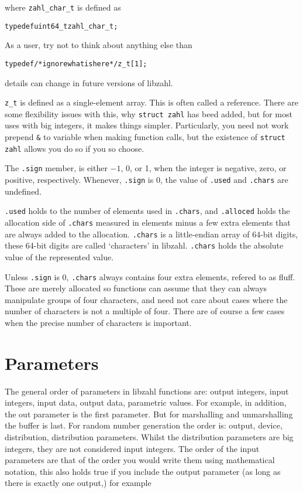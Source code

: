 \noindent
where {\tt zahl\_char\_t} is defined as

\begin{alltt}
   typedef uint64_t zahl_char_t;
\end{alltt}

\noindent
As a user, try not to think about anything else than

\begin{alltt}
   typedef \textcolor{c}{/* \textrm{ignore what is here} */} z_t[1];
\end{alltt}

\noindent
details can change in future versions of libzahl.

{\tt z\_t} is defined as a single-element array.
This is often called a reference. There are some
flexibility issues with this, why {\tt struct zahl}
has beed added, but for most uses with big integers,
it makes things simpler. Particularly, you need not
work prepend {\tt \&} to variable when making function
calls, but the existence of {\tt struct zahl} allows
you do so if you so choose.

The {\tt .sign} member, is either $-1$, 0, or 1,
when the integer is negative, zero, or positive,
respectively. Whenever, {\tt .sign} is 0, the value
of {\tt .used} and {\tt .chars} are undefined.

{\tt .used} holds to the number of elements used in
{\tt .chars}, and {\tt .alloced} holds the allocation
side of {\tt .chars} measured in elements minus a few
extra elements that are always added to the allocation.
{\tt .chars} is a little-endian array of 64-bit digits,
these 64-bit digits are called `characters' in libzahl.
{\tt .chars} holds the absolute value of the
represented value.

Unless {\tt .sign} is 0, {\tt .chars} always contains
four extra elements, refered to as fluff. These are
merely allocated so functions can assume that they can
always manipulate groups of four characters, and need
not care about cases where the number of characters is
not a multiple of four. There are of course a few cases
when the precise number of characters is important.


\newpage
\section{Parameters}
\label{sec:Parameters}

The general order of parameters in libzahl functions
are: output integers, input integers, input data,
output data, parametric values. For example, in
addition, the out parameter is the first parameter.
But for marshalling and unmarshalling the buffer
is last. For random number generation the order is:
output, device, distribution, distribution parameters.
Whilst the distribution parameters are big integers,
they are not considered input integers. The order
of the input parameters are that of the order you
would write them using mathematical notation, this
also holds true if you include the output parameter
(as long as there is exactly one output,) for example

